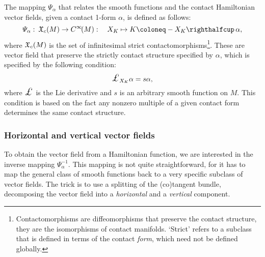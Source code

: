 The mapping \(\Psi_\alpha\) that relates the smooth functions and the contact Hamiltonian vector fields, given a contact 1-form \(\alpha\), is defined as follows:
\begin{equation}
    \Psi_\alpha:\:\vsfields{c}{M} \to \functions{M}: \quad X_K \mapsto K \coloneq -\intpr{X_K}{\alpha}, 
    \label{eq:psi_definition}
\end{equation}
where \(\mathfrak{X}_{c}\qty(M)\) is the set of infinitesimal strict contactomorphisms\footnote{Contactomorphisms are diffeomorphisms that preserve the contact structure, they are the isomorphisms of contact manifolds. `Strict' refers to a subclass that is defined in terms of the contact \emph{form}, which need not be defined globally.}. These are vector field that preserve the strictly contact structure specified by \(\alpha\), which is specified by the following condition:
\begin{equation}
    \lied{X_K}{\alpha} = s \alpha, 
    \label{eq:contact_vf_condition}
\end{equation}
where $\lied{}{}$ is the Lie derivative and \(s\) is an arbitrary smooth function on \(M\). This condition is based on the fact any nonzero multiple of a given contact form determines the same contact structure.

\subsubsection{Horizontal and vertical vector fields} 
To obtain the vector field from a Hamiltonian function, we are interested in the inverse mapping \(\Psi^{-1}_\alpha\). This mapping is not quite straightforward, for it has to map the general class of smooth functions back to a very specific subclass of vector fields. The trick is to use a splitting of the (co)tangent bundle, decomposing the vector field into a \emph{horizontal} and a \emph{vertical} component. 


